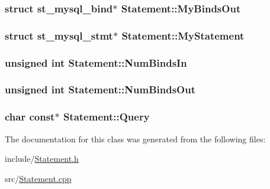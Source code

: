 \subsubsection[{My\+Binds\+Out}]{\setlength{\rightskip}{0pt plus 5cm}struct st\+\_\+mysql\+\_\+bind$\ast$ Statement\+::\+My\+Binds\+Out\hspace{0.3cm}{\ttfamily [protected]}}\label{class_statement_ab9e7e021c560025ec51bc8b7570e6f99}
\hypertarget{class_statement_a8f0cd2a9619ceaee6cd157ce879b2f11}{}
\subsubsection[{My\+Statement}]{\setlength{\rightskip}{0pt plus 5cm}struct st\+\_\+mysql\+\_\+stmt$\ast$ Statement\+::\+My\+Statement\hspace{0.3cm}{\ttfamily [protected]}}\label{class_statement_a8f0cd2a9619ceaee6cd157ce879b2f11}
\hypertarget{class_statement_a596ea0debeeabfb4ee905dc75c0bcbe5}{}
\subsubsection[{Num\+Binds\+In}]{\setlength{\rightskip}{0pt plus 5cm}unsigned int Statement\+::\+Num\+Binds\+In\hspace{0.3cm}{\ttfamily [protected]}}\label{class_statement_a596ea0debeeabfb4ee905dc75c0bcbe5}
\hypertarget{class_statement_a5550223a6881e42d00973968fbdf2b9d}{}
\subsubsection[{Num\+Binds\+Out}]{\setlength{\rightskip}{0pt plus 5cm}unsigned int Statement\+::\+Num\+Binds\+Out\hspace{0.3cm}{\ttfamily [protected]}}\label{class_statement_a5550223a6881e42d00973968fbdf2b9d}
\hypertarget{class_statement_a88a32c1c42ef234f2b417d05375d2a3d}{}
\subsubsection[{Query}]{\setlength{\rightskip}{0pt plus 5cm}char const$\ast$ Statement\+::\+Query\hspace{0.3cm}{\ttfamily [protected]}}\label{class_statement_a88a32c1c42ef234f2b417d05375d2a3d}


The documentation for this class was generated from the following files\+:\begin{DoxyCompactItemize}
\item 
include/\hyperlink{_statement_8h}{Statement.\+h}\item 
src/\hyperlink{_statement_8cpp}{Statement.\+cpp}\end{DoxyCompactItemize}
